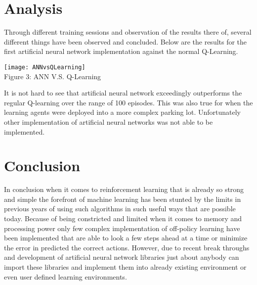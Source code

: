 \documentclass[letterpaper]{article}
\begin{document}
\section{Analysis}

Through different training sessions and observation of the results there of, several different things have been observed and concluded. Below are the results for the first artificial neural network implementation against the normal Q-Learning.  
\begin{center}
\texttt{[image: ANNvsQLearning]}\\
\small{Figure 3: ANN V.S. Q-Learning}
\end{center}

It is not hard to see that artificial neural network exceedingly outperforms the regular Q-learning over the range of 100 episodes.  This was also true for when the learning agents were deployed into a more complex parking lot.  Unfortunately other implementation of artificial neural networks was not able to be implemented. 
\section{Conclusion}

In conclusion when it comes to reinforcement learning that is already so strong and simple the forefront of machine learning has been stunted by the limits in previous years of using such algorithms in such useful ways that are possible today.  Because of being constricted and limited when it comes to memory and processing power only few complex implementation of off-policy learning have been implemented that are able to look a few steps ahead at a time or minimize the error in predicted the correct actions.   However, due to recent break throughs and  development of artificial neural network libraries just about anybody can import these libraries and implement them into already existing environment or even user defined learning environments.  


\end{document}
